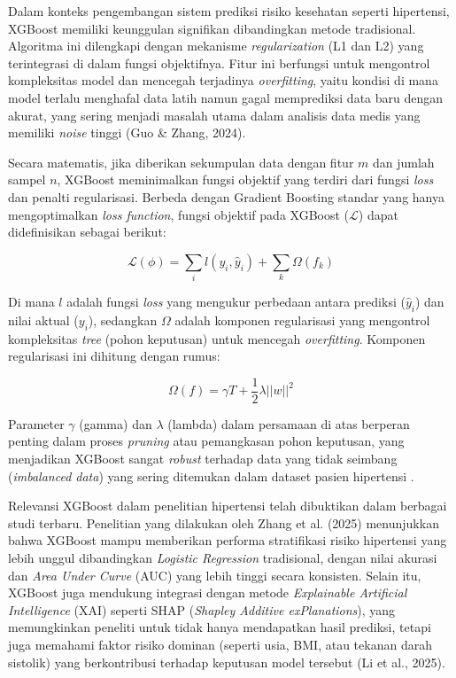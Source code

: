 Dalam konteks pengembangan sistem prediksi risiko kesehatan seperti hipertensi, XGBoost memiliki keunggulan signifikan dibandingkan metode tradisional. Algoritma ini dilengkapi dengan mekanisme \textit{regularization} (L1 dan L2) yang terintegrasi di dalam fungsi objektifnya. Fitur ini berfungsi untuk mengontrol kompleksitas model dan mencegah terjadinya \textit{overfitting}, yaitu kondisi di mana model terlalu menghafal data latih namun gagal memprediksi data baru dengan akurat, yang sering menjadi masalah utama dalam analisis data medis yang memiliki \textit{noise} tinggi (Guo \& Zhang, 2024).

Secara matematis, jika diberikan sekumpulan data dengan fitur $m$ dan jumlah sampel $n$, XGBoost meminimalkan fungsi objektif yang terdiri dari fungsi \textit{loss} dan penalti regularisasi. Berbeda dengan Gradient Boosting standar yang hanya mengoptimalkan \textit{loss function}, fungsi objektif pada XGBoost ($\mathcal{L}$) dapat didefinisikan sebagai berikut:

\begin{equation}
    \mathcal{L}(\phi) = \sum_{i} l(y_i, \hat{y}_i) + \sum_{k} \Omega(f_k)
\end{equation}

Di mana $l$ adalah fungsi \textit{loss} yang mengukur perbedaan antara prediksi ($\hat{y}_i$) dan nilai aktual ($y_i$), sedangkan $\Omega$ adalah komponen regularisasi yang mengontrol kompleksitas \textit{tree} (pohon keputusan) untuk mencegah \textit{overfitting}. Komponen regularisasi ini dihitung dengan rumus:

\begin{equation}
    \Omega(f) = \gamma T + \frac{1}{2}\lambda ||w||^2
\end{equation}

Parameter $\gamma$ (gamma) dan $\lambda$ (lambda) dalam persamaan di atas berperan penting dalam proses \textit{pruning} atau pemangkasan pohon keputusan, yang menjadikan XGBoost sangat \textit{robust} terhadap data yang tidak seimbang (\textit{imbalanced data}) yang sering ditemukan dalam dataset pasien hipertensi \parencite{Emmanuel2025Advanced}.

Relevansi XGBoost dalam penelitian hipertensi telah dibuktikan dalam berbagai studi terbaru. Penelitian yang dilakukan oleh Zhang et al. (2025) menunjukkan bahwa XGBoost mampu memberikan performa stratifikasi risiko hipertensi yang lebih unggul dibandingkan \textit{Logistic Regression} tradisional, dengan nilai akurasi dan \textit{Area Under Curve} (AUC) yang lebih tinggi secara konsisten. Selain itu, XGBoost juga mendukung integrasi dengan metode \textit{Explainable Artificial Intelligence} (XAI) seperti SHAP (\textit{Shapley Additive exPlanations}), yang memungkinkan peneliti untuk tidak hanya mendapatkan hasil prediksi, tetapi juga memahami faktor risiko dominan (seperti usia, BMI, atau tekanan darah sistolik) yang berkontribusi terhadap keputusan model tersebut (Li et al., 2025).
